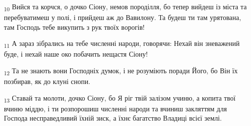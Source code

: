 \begin{tcolorbox}
\textsubscript{10} Вийся та корчся, о дочко Сіону, немов породілля, бо тепер вийдеш із міста та перебуватимеш у полі, і прийдеш аж до Вавилону. Та будеш ти там урятована, там Господь тебе викупить з рук твоїх ворогів!
\end{tcolorbox}
\begin{tcolorbox}
\textsubscript{11} А зараз зібрались на тебе численні народи, говорячи: Нехай він зневажений буде, і нехай наше око побачить нещастя Сіону!
\end{tcolorbox}
\begin{tcolorbox}
\textsubscript{12} Та не знають вони Господніх думок, і не розуміють поради Його, бо Він їх позбирав, як до клуні снопи.
\end{tcolorbox}
\begin{tcolorbox}
\textsubscript{13} Ставай та молоти, дочко Сіону, бо Я ріг твій залізом учиню, а копита твої вчиню міддю, і ти розпорошиш численні народи та вчиниш закляттям для Господа несправедливий їхній зиск, а їхнє багатство Владиці всієї землі.
\end{tcolorbox}
